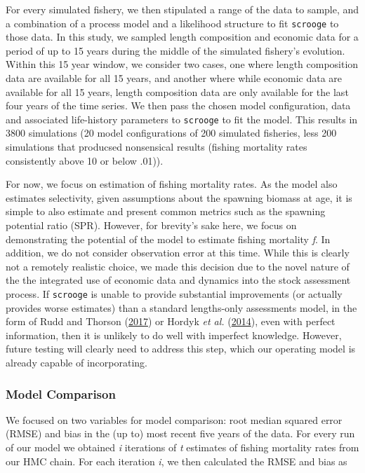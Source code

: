 \documentclass[twoside,12pt,final]{ucthesis-CA2012}
\begin{document}
\begin{ucmainmatter}
For every simulated fishery, we then stipulated a range of the data to
sample, and a combination of a process model and a likelihood structure
to fit \texttt{scrooge} to those data. In this study, we sampled length
composition and economic data for a period of up to 15 years during the
middle of the simulated fishery's evolution. Within this 15 year window,
we consider two cases, one where length composition data are available
for all 15 years, and another where while economic data are available
for all 15 years, length composition data are only available for the
last four years of the time series. We then pass the chosen model
configuration, data and associated life-history parameters to
\texttt{scrooge} to fit the model. This results in 3800 simulations (20
model configurations of 200 simulated fisheries, less 200 simulations
that producsed nonsensical results (fishing mortality rates consistently
above 10 or below .01)).

For now, we focus on estimation of fishing mortality rates. As the model
also estimates selectivity, given assumptions about the spawning biomass
at age, it is simple to also estimate and present common metrics such as
the spawning potential ratio (SPR). However, for brevity's sake here, we
focus on demonstrating the potential of the model to estimate fishing
mortality \emph{f}. In addition, we do not consider observation error at
this time. While this is clearly not a remotely realistic choice, we
made this decision due to the novel nature of the the integrated use of
economic data and dynamics into the stock assessment process. If
\texttt{scrooge} is unable to provide substantial improvements (or
actually provides worse estimates) than a standard lengths-only
assessments model, in the form of Rudd and Thorson
(\protect\hyperlink{ref-Rudd2017}{2017}) or Hordyk \emph{et al.}
(\protect\hyperlink{ref-Hordyk2014}{2014}), even with perfect
information, then it is unlikely to do well with imperfect knowledge.
However, future testing will clearly need to address this step, which
our operating model is already capable of incorporating.

\subsubsection{Model Comparison}\label{model-comparison}

We focused on two variables for model comparison: root median squared
error (RMSE) and bias in the (up to) most recent five years of the data.
For every run of our model we obtained \emph{i} iterations of \emph{t}
estimates of fishing mortality rates from our HMC chain. For each
iteration \emph{i}, we then calculated the RMSE and bias as


\end{ucmainmatter}
\end{document}
